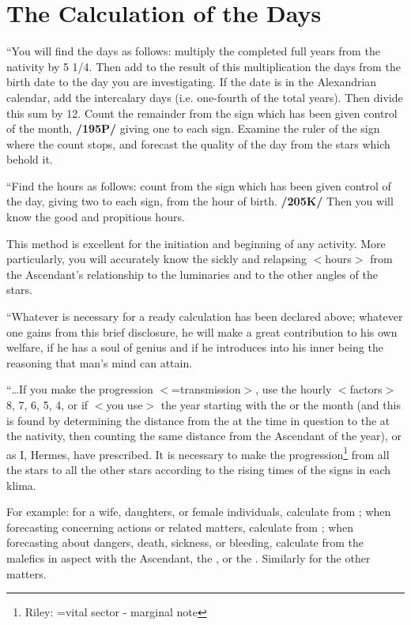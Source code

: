 \section{The Calculation of the Days}

“You will find the days as follows: multiply the completed full years from the nativity by 5 1/4.
Then add to the result of this multiplication the days from the birth date to the day you are investigating.
If the date is in the Alexandrian calendar, add the intercalary days (i.e. one-fourth of the total years). Then divide this sum by 12. Count the remainder from the sign which has been given control of the month, \textbf{/195P/} giving one to each sign. Examine the ruler of the sign where the count stops, and forecast the quality of the day from the stars which behold it.

“Find the hours as follows: count from the sign which has been given control of the day, giving two to each sign, from the hour of birth. \textbf{/205K/} Then you will know the good and propitious hours. 

This method is excellent for the initiation and beginning of any activity. More particularly, you will accurately
know the sickly and relapsing $<$hours$>$ from the Ascendant’s relationship to the luminaries and to the other angles of the stars.

“Whatever is necessary for a ready calculation has been declared above; whatever one gains from this brief disclosure, he will make a great contribution to his own welfare, if he has a soul of genius and if he introduces into his inner being the reasoning that man’s mind can attain.

“…If you make the progression $<$=transmission$>$, use the hourly $<$factors$>$ 8, 7, 6, 5, 4, or if $<$you
use$>$ the year starting with the \Sun\xspace or the month (and this is found by determining the distance from the \Sun\xspace at the time in question to the \Moon\xspace at the nativity, then counting the same distance from the Ascendant of the year), or as I, Hermes, have prescribed. It is necessary to make the progression\footnote{Riley: =vital sector - marginal note} from all the stars to all the other stars according to the rising times of the signs in each klima. 

For example: for a wife, daughters, or female individuals, calculate from \Venus; when forecasting concerning actions or related matters, calculate from \Mercury; when forecasting about dangers, death, sickness, or bleeding, calculate from the malefics in aspect with the Ascendant, the \Sun, or the \Moon. Similarly for the other matters. 

